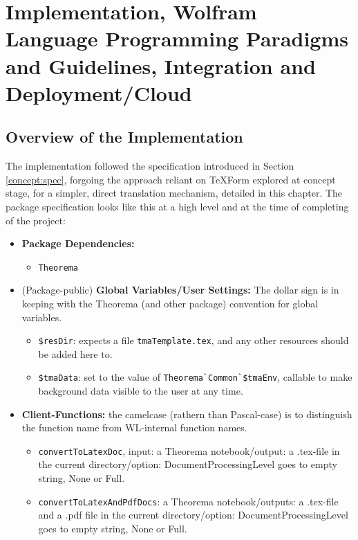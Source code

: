 \chapter[Implementation]{Implementation, Wolfram Language Programming Paradigms and Guidelines, Integration and Deployment/Cloud}
\label{cha:Implementation}

\section{Overview of the Implementation}

The implementation followed the specification introduced in Section \ref{concept:spec}, forgoing the approach reliant on TeXForm explored at concept stage, for a simpler, direct translation mechanism, detailed in this chapter. The package specification looks like this at a high level and at the time of completing of the project:

\begin{itemize}
    \item \textbf{Package Dependencies:}
    \begin{itemize}
        \item \texttt{Theorema} 
    \end{itemize}
    
    \item (Package-public) \textbf{Global Variables/User Settings:} The dollar sign is in keeping with the Theorema (and other package) convention for global variables.
    \begin{itemize}
        \item \texttt{\$resDir}: expects a file \lstinline+tmaTemplate.tex+, and any other resources should be added here to.
        \item \texttt{\$tmaData}: set to the value of \lstinline+Theorema`Common`$tmaEnv+, callable to make background data visible to the user at any time.
    \end{itemize}

    \item \textbf{Client-Functions:} the camelcase (rathern than Pascal-case) is to distinguish the function name from WL-internal function names.
    \begin{itemize}
        \item \texttt{convertToLatexDoc}, input: a Theorema notebook/output: a .tex-file in the current directory/option: DocumentProcessingLevel goes to empty string, None or Full.
        \item \texttt{convertToLatexAndPdfDocs}: a Theorema notebook/outputs: a .tex-file and a .pdf file in the current directory/option: DocumentProcessingLevel goes to empty string, None or Full.
    \end{itemize}
\end{itemize}

